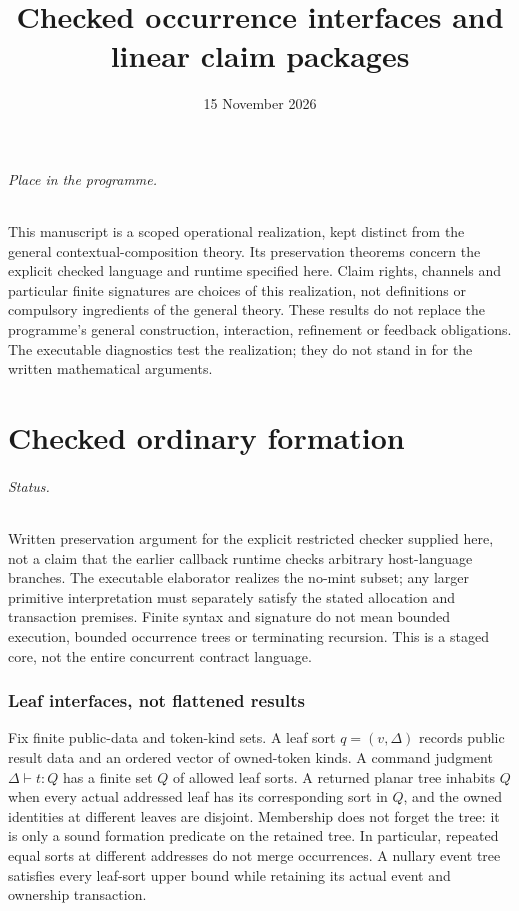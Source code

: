 \documentclass[11pt]{article}
\title{Checked occurrence interfaces and linear claim packages}
\author{}\date{15 November 2026}
\begin{document}
\maketitle
\paragraph{Place in the programme.} This manuscript is a scoped operational realization, kept distinct from the general contextual-composition theory. Its preservation theorems concern the explicit checked language and runtime specified here. Claim rights, channels and particular finite signatures are choices of this realization, not definitions or compulsory ingredients of the general theory. These results do not replace the programme's general construction, interaction, refinement or feedback obligations. The executable diagnostics test the realization; they do not stand in for the written mathematical arguments.

\part{Checked ordinary formation}

\paragraph{Status.} Written preservation argument for the explicit restricted checker supplied here, not a claim that the earlier callback runtime checks arbitrary host-language branches. The executable elaborator realizes the no-mint subset; any larger primitive interpretation must separately satisfy the stated allocation and transaction premises. Finite syntax and signature do not mean bounded execution, bounded occurrence trees or terminating recursion. This is a staged core, not the entire concurrent contract language.

\section{Leaf interfaces, not flattened results}
Fix finite public-data and token-kind sets. A leaf sort $q=(v,\Delta)$ records public result data and an ordered vector of owned-token kinds. A command judgment $\Delta\vdash t:Q$ has a finite set $Q$ of allowed leaf sorts. A returned planar tree inhabits $Q$ when every actual addressed leaf has its corresponding sort in $Q$, and the owned identities at different leaves are disjoint. Membership does not forget the tree: it is only a sound formation predicate on the retained tree. In particular, repeated equal sorts at different addresses do not merge occurrences. A nullary event tree satisfies every leaf-sort upper bound while retaining its actual event and ownership transaction.
\end{document}
